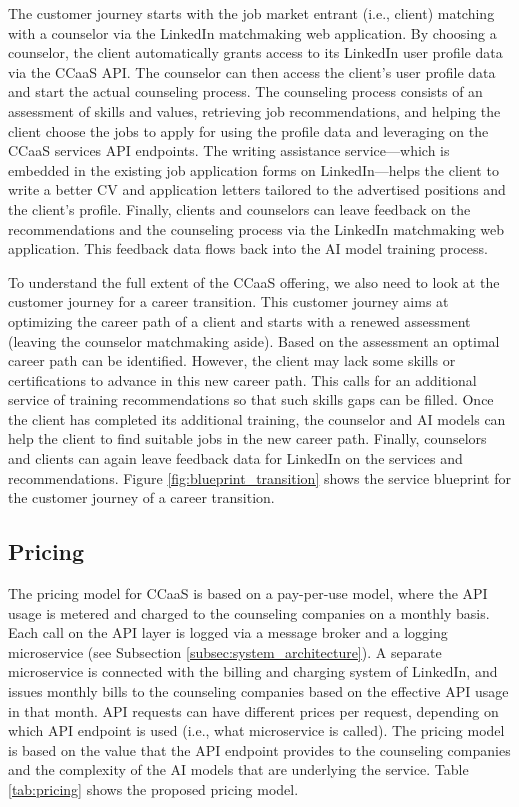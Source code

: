 The customer journey starts with the job market entrant (i.e., client) matching with a counselor
via the LinkedIn matchmaking web application. By choosing a counselor, the client automatically
grants access to its LinkedIn user profile data via the CCaaS API. The counselor can then access
the client's user profile data and start the actual counseling process. The counseling process
consists of an assessment of skills and values, retrieving job recommendations, and helping the
client choose the jobs to apply for using the profile data and leveraging on the CCaaS services
API endpoints. The writing assistance service---which is embedded in the existing job application
forms on LinkedIn---helps the client to write a better CV and application letters tailored to the
advertised positions and the client's profile. Finally, clients and counselors can leave feedback
on the recommendations and the counseling process via the LinkedIn matchmaking web application.
This feedback data flows back into the AI model training process.

To understand the full extent of the CCaaS offering, we also need to look at the customer journey
for a career transition. This customer journey aims at optimizing the career path of a client and
starts with a renewed assessment (leaving the counselor matchmaking aside). Based on the assessment
an optimal career path can be identified. However, the client may lack some skills or certifications
to advance in this new career path. This calls for an additional service of training recommendations
so that such skills gaps can be filled. Once the client has completed its additional training, the
counselor and AI models can help the client to find suitable jobs in the new career path. Finally,
counselors and clients can again leave feedback data for LinkedIn on the services and recommendations.
Figure \ref{fig:blueprint_transition} shows the service blueprint for the customer journey of a 
career transition.

\subsection{Pricing}

The pricing model for CCaaS is based on a pay-per-use model, where the API usage is metered and
charged to the counseling companies on a monthly basis. Each call on the API layer is logged via
a message broker and a logging microservice (see Subsection \ref{subsec:system_architecture}).
A separate microservice is connected with the billing and charging system of LinkedIn, and issues monthly
bills to the counseling companies based on the effective API usage in that month. API requests
can have different prices per request, depending on which API endpoint is used (i.e., what microservice
is called). The pricing model is based on the value that the API endpoint provides to the counseling
companies and the complexity of the AI models that are underlying the service. Table \ref{tab:pricing}
shows the proposed pricing model.

